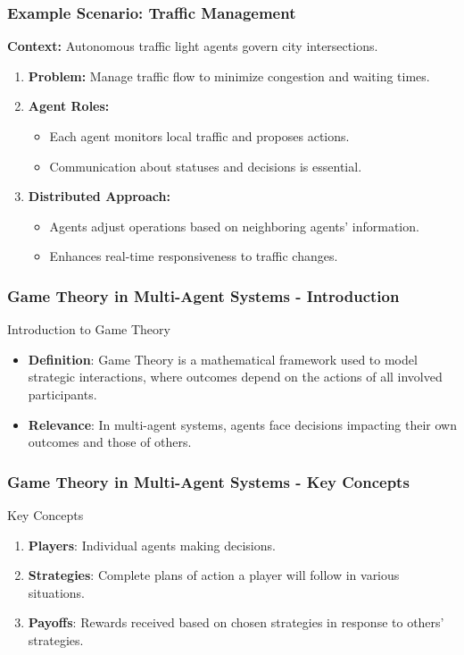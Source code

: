 \documentclass[aspectratio=169]{beamer}
\begin{document}
\begin{frame}[fragile]
    \frametitle{Example Scenario: Traffic Management}
    \textbf{Context:} Autonomous traffic light agents govern city intersections.

    \begin{enumerate}
        \item \textbf{Problem:} 
        Manage traffic flow to minimize congestion and waiting times.

        \item \textbf{Agent Roles:}
        \begin{itemize}
            \item Each agent monitors local traffic and proposes actions.
            \item Communication about statuses and decisions is essential.
        \end{itemize}

        \item \textbf{Distributed Approach:}
        \begin{itemize}
            \item Agents adjust operations based on neighboring agents’ information.
            \item Enhances real-time responsiveness to traffic changes.
        \end{itemize}
    \end{enumerate}
\end{frame}

\begin{frame}[fragile]
    \frametitle{Game Theory in Multi-Agent Systems - Introduction}
    \begin{block}{Introduction to Game Theory}
        \begin{itemize}
            \item \textbf{Definition}: Game Theory is a mathematical framework used to model strategic interactions, where outcomes depend on the actions of all involved participants.
            \item \textbf{Relevance}: In multi-agent systems, agents face decisions impacting their own outcomes and those of others.
        \end{itemize}
    \end{block}
\end{frame}

\begin{frame}[fragile]
    \frametitle{Game Theory in Multi-Agent Systems - Key Concepts}
    \begin{block}{Key Concepts}
        \begin{enumerate}
            \item \textbf{Players}: Individual agents making decisions.
            \item \textbf{Strategies}: Complete plans of action a player will follow in various situations.
            \item \textbf{Payoffs}: Rewards received based on chosen strategies in response to others' strategies.
        \end{enumerate}
    \end{block}
\end{frame}
\end{document}
